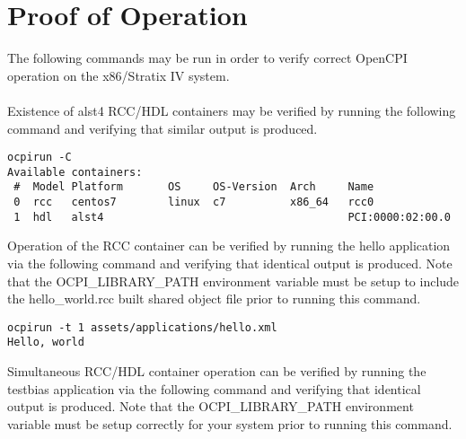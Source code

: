 \documentclass{article}
\begin{document}
\section{Proof of Operation}
The following commands may be run in order to verify correct OpenCPI operation on the x86/Stratix IV system.\\ \\
Existence of alst4 RCC/HDL containers may be verified by running the following command and verifying that similar output is produced.\\
\begin{lstlisting}
ocpirun -C
Available containers:
 #  Model Platform       OS     OS-Version  Arch     Name
 0  rcc   centos7        linux  c7          x86_64   rcc0
 1  hdl   alst4                                      PCI:0000:02:00.0
\end{lstlisting}
Operation of the RCC container can be verified by running the hello application via the following command and verifying that identical output is produced. Note that the OCPI\_LIBRARY\_PATH environment variable must be setup to include the hello\_world.rcc built shared object file prior to running this command.
\begin{lstlisting}
ocpirun -t 1 assets/applications/hello.xml
Hello, world
\end{lstlisting}
Simultaneous RCC/HDL container operation can be verified by running the testbias application via the following command and verifying that identical output is produced. Note that the OCPI\_LIBRARY\_PATH environment variable must be setup correctly for your system prior to running this command.\\
\end{document}
